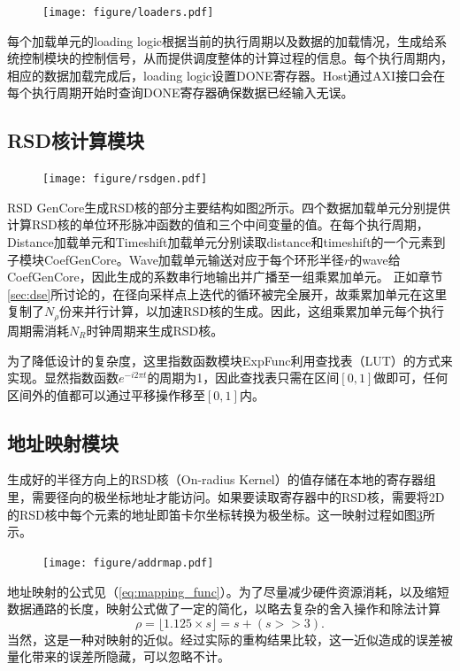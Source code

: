 \documentclass[master]{shtthesis}             %
\begin{document}
\begin{figure}[!tb]
  \centering
  \texttt{[image: figure/loaders.pdf]}
  \label{fig:loaders}
\end{figure}

每个加载单元的loading logic根据当前的执行周期以及数据的加载情况，生成给系统控制模块的控制信号，从而提供调度整体的计算过程的信息。每个执行周期内，相应的数据加载完成后，loading logic设置DONE寄存器。Host通过AXI接口会在每个执行周期开始时查询DONE寄存器确保数据已经输入无误。

\subsection{RSD核计算模块} 

\begin{figure}[!tb]
    \centering
    \texttt{[image: figure/rsdgen.pdf]}
    \label{fig:rkg}
\end{figure}

RSD GenCore生成RSD核的部分主要结构如图\ref{fig:rkg}所示。四个数据加载单元分别提供计算RSD核的单位环形脉冲函数的值和三个中间变量的值。在每个执行周期，Distance加载单元和{Timeshift}加载单元分别读取{distance}和{timeshift}的一个元素到子模块{CoefGenCore}。Wave加载单元输送对应于每个环形半径$r$的{wave}给{CoefGenCore}，因此生成的系数串行地输出并广播至一组乘累加单元。
正如章节\ref{sec:dse}所讨论的，在径向采样点上迭代的循环被完全展开，故乘累加单元在这里复制了$N_\rho$份来并行计算，以加速RSD核的生成。因此，这组乘累加单元每个执行周期需消耗$N_R$时钟周期来生成RSD核。

为了降低设计的复杂度，这里指数函数模块{ExpFunc}利用查找表（LUT）的方式来实现。显然指数函数$e^{-i2\pi t}$的周期为1，因此查找表只需在区间$[0,1]$做即可，任何区间外的值都可以通过平移操作移至$[0,1]$内。

\subsection{地址映射模块}

生成好的半径方向上的RSD核（On-radius Kernel）的值存储在本地的寄存器组里，需要径向的极坐标地址才能访问。如果要读取寄存器中的RSD核，需要将2D的RSD核中每个元素的地址即笛卡尔坐标转换为极坐标。这一映射过程如图\ref{fig:addrmap}所示。
\begin{figure}[!tb]
    \centering
    \texttt{[image: figure/addrmap.pdf]}
    \label{fig:addrmap}
\end{figure}
地址映射的公式见（\ref{eq:mapping_func}）。为了尽量减少硬件资源消耗，以及缩短数据通路的长度，映射公式做了一定的简化，以略去复杂的舍入操作和除法计算
\begin{equation}
  \rho = \lfloor 1.125 \times s\rfloor = s + (s >> 3).
\end{equation}
当然，这是一种对映射的近似。经过实际的重构结果比较，这一近似造成的误差被量化带来的误差所隐藏，可以忽略不计。
\end{document}
